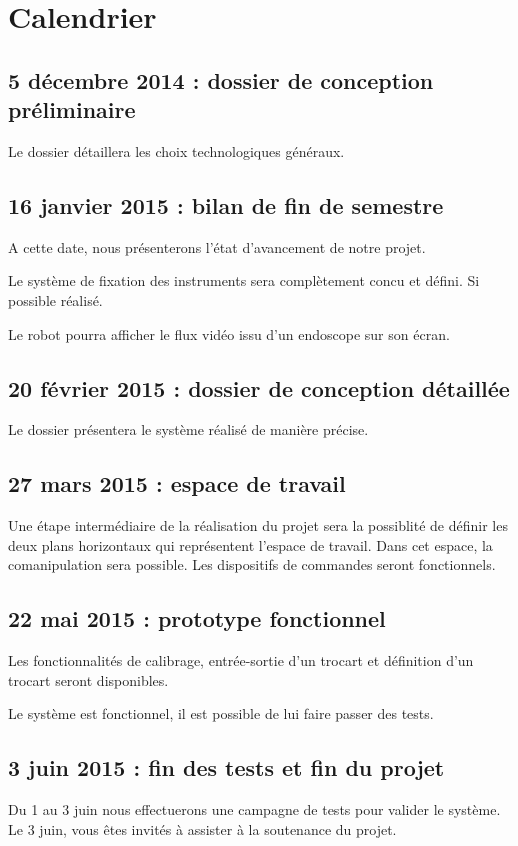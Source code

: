 \chapter{Calendrier}

    \section{5 décembre 2014 : dossier de conception préliminaire}
    
    Le dossier détaillera les choix technologiques généraux.
    
    \section{16 janvier 2015 : bilan de fin de semestre}
    
    A cette date, nous présenterons l'état d'avancement de notre projet.
    
    Le système de fixation des instruments sera complètement concu et défini. Si possible réalisé.
    
    Le robot pourra afficher le flux vidéo issu d'un endoscope sur son écran.

    \section{20 février 2015 : dossier de conception détaillée}
    
    Le dossier présentera le système réalisé de manière précise.
    
    \section{27 mars 2015 : espace de travail}
    
    Une étape intermédiaire de la réalisation du projet sera la possiblité de définir les deux plans horizontaux qui représentent l'espace de travail. Dans cet espace, la comanipulation sera possible. Les dispositifs de commandes seront fonctionnels.

    \section{22 mai 2015 : prototype fonctionnel}

    Les fonctionnalités de calibrage, entrée-sortie d'un trocart et définition d'un trocart seront disponibles.
    
    Le système est fonctionnel, il est possible de lui faire passer des tests.

    \section{3 juin 2015 : fin des tests et fin du projet}
    
    Du 1 au 3 juin nous effectuerons une campagne de tests pour valider le système.
    Le 3 juin, vous êtes invités à assister à la soutenance du projet.